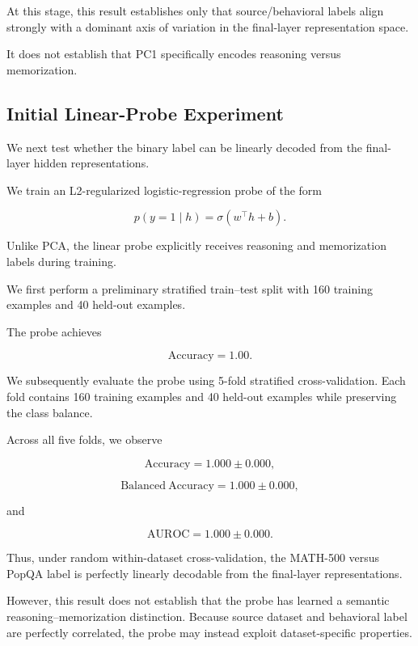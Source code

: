 \documentclass[11pt]{article}
\begin{document}
At this stage, this result establishes only that source/behavioral
labels align strongly with a dominant axis of variation in the
final-layer representation space.

It does not establish that PC1 specifically encodes reasoning versus
memorization.


\subsection{Initial Linear-Probe Experiment}

We next test whether the binary label can be linearly decoded from the
final-layer hidden representations.

We train an L2-regularized logistic-regression probe of the form

\[
p(y=1\mid h)
=
\sigma(w^\top h+b).
\]

Unlike PCA, the linear probe explicitly receives reasoning and
memorization labels during training.

We first perform a preliminary stratified train--test split with 160
training examples and 40 held-out examples.

The probe achieves

\[
\mathrm{Accuracy}=1.00.
\]

We subsequently evaluate the probe using 5-fold stratified
cross-validation. Each fold contains 160 training examples and 40
held-out examples while preserving the class balance.

Across all five folds, we observe

\[
\mathrm{Accuracy}
=
1.000 \pm 0.000,
\]

\[
\mathrm{Balanced\ Accuracy}
=
1.000 \pm 0.000,
\]

and

\[
\mathrm{AUROC}
=
1.000 \pm 0.000.
\]

Thus, under random within-dataset cross-validation, the MATH-500 versus
PopQA label is perfectly linearly decodable from the final-layer
representations.

However, this result does not establish that the probe has learned a
semantic reasoning--memorization distinction. Because source dataset
and behavioral label are perfectly correlated, the probe may instead
exploit dataset-specific properties.

\end{document}
